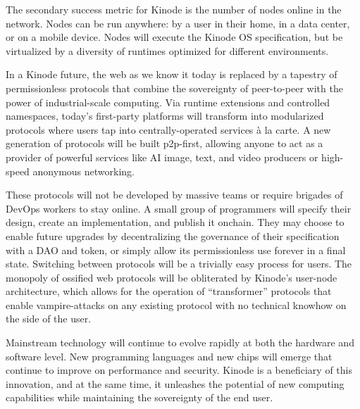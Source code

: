 \documentclass[runningheads]{llncs}
\begin{document}
The secondary success metric for Kinode is the number of nodes online in the network.
Nodes can be run anywhere: by a user in their home, in a data center, or on a mobile device.
Nodes will execute the Kinode OS specification, but be virtualized by a diversity of runtimes optimized for different environments.

In a Kinode future, the web as we know it today is replaced by a tapestry of permissionless protocols that combine the sovereignty of peer-to-peer with the power of industrial-scale computing.
Via runtime extensions and controlled namespaces, today's first-party platforms will transform into modularized protocols where users tap into centrally-operated services à la carte.
A new generation of protocols will be built p2p-first, allowing anyone to act as a provider of powerful services like AI image, text, and video producers or high-speed anonymous networking.

These protocols will not be developed by massive teams or require brigades of DevOps workers to stay online.
A small group of programmers will specify their design, create an implementation, and publish it onchain.
They may choose to enable future upgrades by decentralizing the governance of their specification with a DAO and token, or simply allow its permissionless use forever in a final state.
Switching between protocols will be a trivially easy process for users.
The monopoly of ossified web protocols will be obliterated by Kinode's user-node architecture, which allows for the operation of ``transformer'' protocols that enable vampire-attacks on any existing protocol with no technical knowhow on the side of the user.

Mainstream technology will continue to evolve rapidly at both the hardware and software level. New programming languages and new chips will emerge that continue to improve on performance and security.
Kinode is a beneficiary of this innovation, and at the same time, it unleashes the potential of new computing capabilities while maintaining the sovereignty of the end user.
\end{document}
